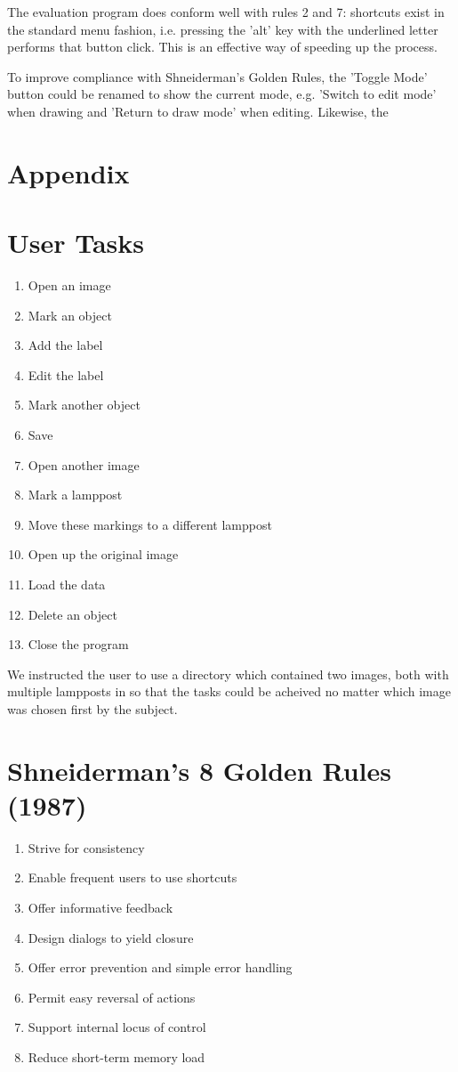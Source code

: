 \documentclass[a4paper,11pt,oneside]{article}
\begin{document}
The evaluation program does conform well with rules 2 and 7: shortcuts exist in the standard menu fashion, i.e. pressing the 'alt' key with the underlined letter performs that button click. This is an effective way of speeding up the process.

To improve compliance with Shneiderman's Golden Rules, the 'Toggle Mode' button could be renamed to show the current mode, e.g. 'Switch to edit mode' when drawing and 'Return to draw mode' when editing. Likewise, the 

\newpage
\section{Appendix}
\appendix

\section{User Tasks}
\label{sec:tasks}

\begin{enumerate}
\item Open an image
\item Mark an object
\item Add the label
\item Edit the label
\item Mark another object
\item Save
\item Open another image
\item Mark a lamppost
\item Move these markings to a different lamppost
\item Open up the original image
\item Load the data
\item Delete an object
\item Close the program
\end{enumerate}

We instructed the user to use a directory which contained two images, both with multiple lampposts in so that the tasks could be acheived no matter which image was chosen first by the subject.

\section{Shneiderman’s 8 Golden Rules (1987)}
\label{sec:s_rules}
\begin{enumerate}
\item Strive for consistency
\item Enable frequent users to use shortcuts
\item Offer informative feedback
\item Design dialogs to yield closure
\item Offer error prevention and simple error handling
\item Permit easy reversal of actions
\item Support internal locus of control
\item Reduce short-term memory load 
\end{enumerate}
\end{document}
